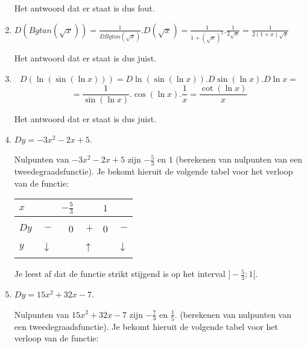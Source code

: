 \documentclass{article}
\begin{document}
\begin{enumerate}
Het antwoord dat er staat is dus fout.

\item

$D \left(  Bgtan \left(  \sqrt{x} \right) \right)=\frac{1}{D Bgtan \left( \sqrt{x} \right)}.D \left( \sqrt{x} \right)=\frac{1}{1+\left( \sqrt{x}  \right)^2}.\frac{1}{2 \sqrt{x}}=\frac{1}{2(1+x)\sqrt{x}}$

Het antwoord dat er staat is dus juist.

\item

\[
D \left( \ln \left( \sin \left( \ln x \right) \right) \right)=D \ln \left( \sin \left( \ln x \right) \right).D\sin (\ln x).D \ln x=
\]
\[
=\frac{1}{\sin (\ln x)}.\cos ( \ln x).\frac{1}{x}=\frac {\cot ( \ln x)}{x}
\]

Het antwoord dat er staat is dus juist.

\item
$Dy=-3x^2-2x+5$.

Nulpunten van $-3x^2-2x+5$ zijn $-\frac{5}{3}$ en $1$ (berekenen van nulpunten van een tweedegraadsfunctie).
Je bekomt hieruit de volgende tabel voor het verloop van de functie:

\hspace{5mm}\begin{tabular}{ |  l | r | r | r | r| r| }
\hline
$x$ & \hspace{8mm}  & $-\frac{5}{3}$ & \hspace{8mm} & $1$ &  \hspace{8mm} \\  \hline
  &   &   &    &  &       \\ 
$Dy$ & $-$ &  0 & $+$ & 0 & $-$ \\ 
  &   &   &   &  &   \\ \hline
$y$ & $\downarrow$ &  & $\uparrow$ &  & $\downarrow$\\
 &  &  &  &  &     \\ \hline
\end{tabular}\vspace{5mm}

Je leest af dat de functie strikt stijgend is op het interval $]-\frac{5}{3}; 1[$.

\item
$Dy=15x^2+32x-7$.

Nulpunten van $15x^2+32x-7$ zijn $-\frac{7}{3}$ en $\frac{1}{5}$. (berekenen van nulpunten van een tweedegraadsfunctie).
Je bekomt hieruit de volgende tabel voor het verloop van de functie:


\end{enumerate}
\end{document}

